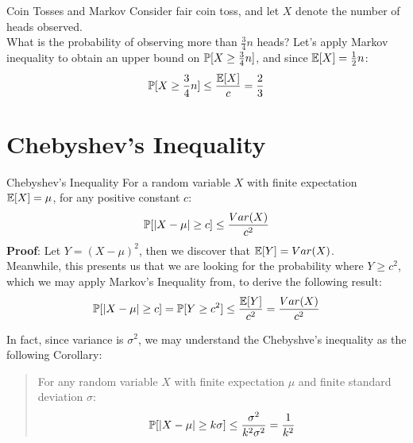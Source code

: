 \begin{ln-quest}{Coin Tosses and Markov}{}
    Consider fair coin toss, and let $X$ denote the number of heads observed. \\
    What is the probability of observing more than $\frac{3}{4} n$ heads? Let's apply Markov inequality to obtain an upper bound on $\P[X \geq \frac{3}{4} n]$, and since $\E[X] = \frac{1}{2} n$:
    \[
        \P[X \geq \frac{3}{4} n] \leq \frac{\E[X]}{c} = \frac{2}{3}
    \]
\end{ln-quest}

\section{Chebyshev's Inequality}
\begin{ln-theorem}{Chebyshev's Inequality}{}
    For a random variable $X$ with finite expectation $\E[X] = \mu$, for any positive constant $c$:
    \[
        \P[|X - \mu| \geq c] \leq \frac{Var(X)}{c^2}
    \]
    \tcblower
    \textbf{Proof}:
    Let $Y = {(X - \mu)}^2$, then we discover that $\E[Y] = Var(X)$. \\
    Meanwhile, this presents us that we are looking for the probability where $Y \geq c^2$, which we may apply Markov's Inequality from, to derive the following result:
    \[
        \P[|X - \mu| \geq c] = \P[Y \geq c^2] \leq \frac{\E[Y]}{c^2} = \frac{Var(X)}{c^2}
    \]
\end{ln-theorem}
In fact, since variance is $\sigma^2$, we may understand the Chebyshve's inequality as the following Corollary:
\begin{quote}
    For any random variable $X$ with finite expectation $\mu$ and finite standard deviation $\sigma$:
    \[\P[|X - \mu| \geq k \sigma] \leq \frac{\sigma^2}{k^2 \sigma^2} = \frac{1}{k^2}\]
\end{quote}

